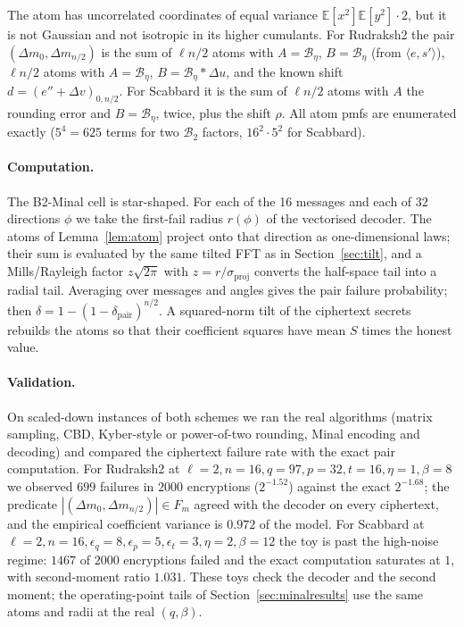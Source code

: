 \documentclass[11pt,a4paper]{article}
\theoremstyle{definition}
\theoremstyle{remark}
\newcommand{\E}{\mathbb{E}}
\newcommand{\dfr}{\delta}
\newcommand{\CBD}{\mathcal{B}}
\newcommand{\Dm}{\Delta m}
\begin{document}
The atom has uncorrelated coordinates of equal variance
$\E[x^2]\E[y^2]\cdot 2$, but it is not Gaussian and not isotropic in its
higher cumulants. For Rudraksh2 the pair $(\Dm_0,\Dm_{n/2})$ is the sum of
$\ell n/2$ atoms with $A=\CBD_\eta$, $B=\CBD_\eta$ (from $\langle e,s'\rangle$),
$\ell n/2$ atoms with $A=\CBD_\eta$, $B=\CBD_\eta*\Delta u$, and the known
shift $d=(e''+\Delta v)_{0,n/2}$. For Scabbard it is the sum of $\ell n/2$
atoms with $A$ the rounding error and $B=\CBD_\eta$, twice, plus the shift
$\rho$. All atom pmfs are enumerated exactly ($5^4=625$ terms for two
$\CBD_2$ factors, $16^2\cdot 5^2$ for Scabbard).

\paragraph{Computation.}
The B2-Minal cell is star-shaped. For each of the 16 messages and each of
$32$ directions $\phi$ we take the first-fail radius $r(\phi)$ of the
vectorised decoder. The atoms of Lemma~\ref{lem:atom} project onto that
direction as one-dimensional laws; their sum is evaluated by the same
tilted FFT as in Section~\ref{sec:tilt}, and a Mills/Rayleigh factor
$z\sqrt{2\pi}$ with $z=r/\sigma_{\mathrm{proj}}$ converts the half-space
tail into a radial tail. Averaging over messages and angles gives the pair
failure probability; then $\dfr=1-(1-\dfr_{\mathrm{pair}})^{n/2}$. A
squared-norm tilt of the ciphertext secrets rebuilds the atoms so that
their coefficient squares have mean $S$ times the honest value.

\paragraph{Validation.}
On scaled-down instances of both schemes we ran the real algorithms
(matrix sampling, CBD, Kyber-style or power-of-two rounding, Minal
encoding and decoding) and compared the ciphertext failure rate with the
exact pair computation. For Rudraksh2 at
$\ell=2,n=16,q=97,p=32,t=16,\eta=1,\beta=8$ we observed $699$ failures in
$2000$ encryptions ($2^{-1.52}$) against the exact $2^{-1.68}$; the
predicate $|(\Dm_0,\Dm_{n/2})|\in F_m$ agreed with the decoder on every
ciphertext, and the empirical coefficient variance is $0.972$ of the
model. For Scabbard at
$\ell=2,n=16,\epsilon_q=8,\epsilon_p=5,\epsilon_t=3,\eta=2,\beta=12$ the
toy is past the high-noise regime: $1467$ of $2000$ encryptions failed
and the exact computation saturates at $1$, with second-moment ratio
$1.031$. These toys check the decoder and the second moment; the
operating-point tails of Section~\ref{sec:minalresults} use the same
atoms and radii at the real $(q,\beta)$.
\end{document}
